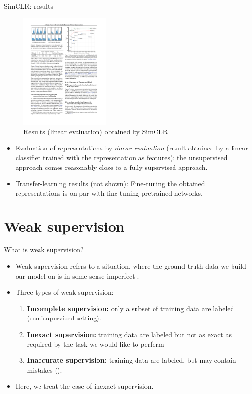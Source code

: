 \documentclass[xcolor=pdftex,dvipsnames,table]{beamer}
\begin{document}
\begin{frame}{SimCLR: results}
\begin{figure}[htb]
   \centering
   \includegraphics[width=0.4\textwidth]{../graphics/simclr_results.pdf}
   \caption{Results (linear evaluation) obtained by SimCLR \cite{Chen2020}}
\end{figure}
\begin{itemize}
\item Evaluation of representations by \emph{linear evaluation} (result obtained by a linear classifier trained with the representation as features): the unsupervised approach comes reasonably close to a fully supervised approach. 
\item Transfer-learning results (not shown): Fine-tuning the obtained representations is on par with fine-tuning pretrained networks. 
\end{itemize}
\end{frame}

\section{Weak supervision}

\begin{frame}{What is weak supervision?}
\begin{itemize}
\item Weak supervision refers to a situation, where the ground truth data we build our model on is in some sense imperfect \cite{Zhou2018}. 
\item Three types of weak supervision:
\begin{enumerate}
\item \textbf{Incomplete supervision:} only a subset of training data are labeled (semisupervised setting).
\item \textbf{Inexact supervision:} training data are labeled but not as exact as required by the task we would like to perform
\item \textbf{Inaccurate supervision:} training data are labeled, but may contain mistakes (). 
\end{enumerate}
\item Here, we treat the case of inexact supervision. 
\end{itemize}
\end{frame}
\end{document}

